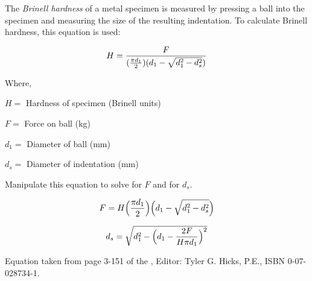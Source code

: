 

The {\it Brinell hardness} of a metal specimen is measured by pressing a ball into the specimen and measuring the size of the resulting indentation.  To calculate Brinell hardness, this equation is used:

$$H = {F \over ({\pi d_1 \over 2}) ({d_1 - \sqrt{d_1^2 - d_s^2}})}$$

\noindent
Where,

$H =$ Hardness of specimen (Brinell units)

$F =$ Force on ball (kg)

$d_1 =$ Diameter of ball (mm)

$d_s =$ Diameter of indentation (mm)

\vskip 10pt

Manipulate this equation to solve for $F$ and for $d_s$.







$$F = H \Bigl({\pi d_1 \over 2}\Bigr) \Bigl({d_1 - \sqrt{d_1^2 - d_s^2}}\Bigr)$$

\vskip 20pt

$$d_s = \sqrt{d_1^2 - \Bigl( d_1 - {2F \over H \pi d_1} \Bigr)^2}$$







Equation taken from page 3-151 of the , Editor: Tyler G. Hicks, P.E., ISBN 0-07-028734-1.




